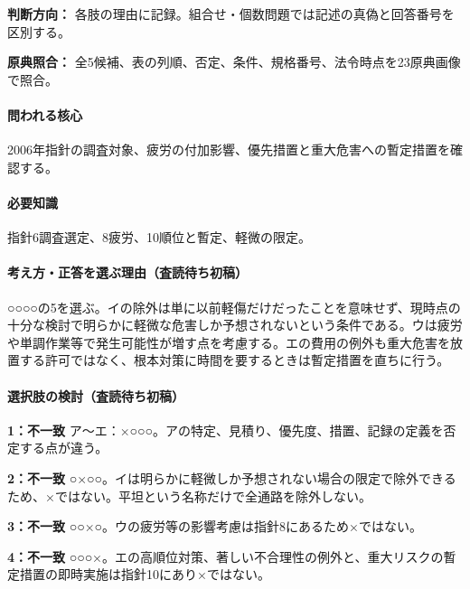 \noindent\textbf{判断方向：} 各肢の理由に記録。組合せ・個数問題では記述の真偽と回答番号を区別する。\par

\noindent\textbf{原典照合：} 全5候補、表の列順、否定、条件、規格番号、法令時点を23原典画像で照合。\par

\paragraph{問われる核心} 2006年指針の調査対象、疲労の付加影響、優先措置と重大危害への暫定措置を確認する。

\paragraph{必要知識} 指針6調査選定、8疲労、10順位と暫定、軽微の限定。

\paragraph{考え方・正答を選ぶ理由（査読待ち初稿）} ○○○○の5を選ぶ。イの除外は単に以前軽傷だけだったことを意味せず、現時点の十分な検討で明らかに軽微な危害しか予想されないという条件である。ウは疲労や単調作業等で発生可能性が増す点を考慮する。エの費用の例外も重大危害を放置する許可ではなく、根本対策に時間を要するときは暫定措置を直ちに行う。

\paragraph{選択肢の検討（査読待ち初稿）}\mbox{}\par

\noindent\textbf{1：不一致} ア〜エ：×○○○。アの特定、見積り、優先度、措置、記録の定義を否定する点が違う。\par

\noindent\textbf{2：不一致} ○×○○。イは明らかに軽微しか予想されない場合の限定で除外できるため、×ではない。平坦という名称だけで全通路を除外しない。\par

\noindent\textbf{3：不一致} ○○×○。ウの疲労等の影響考慮は指針8にあるため×ではない。\par

\noindent\textbf{4：不一致} ○○○×。エの高順位対策、著しい不合理性の例外と、重大リスクの暫定措置の即時実施は指針10にあり×ではない。\par

